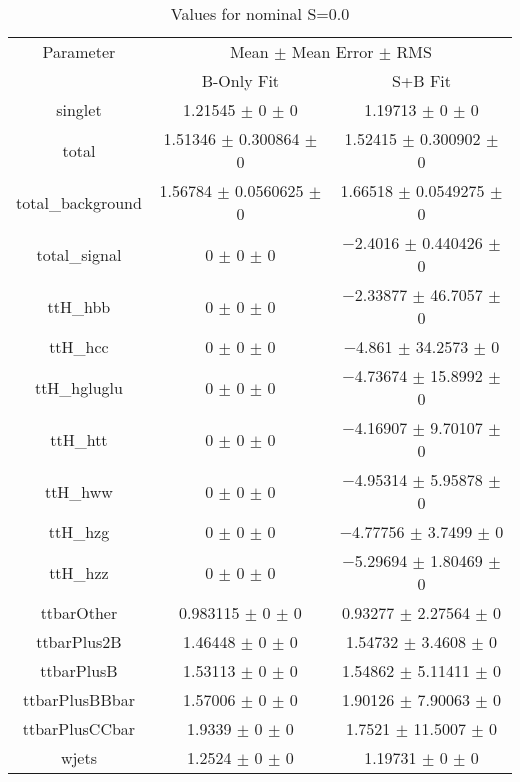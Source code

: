 \begin{table}
\centering
\caption{Values for nominal S=0.0}
\begin{tabular}{ccc}
\toprule
Parameter & \multicolumn{2}{c}{Mean $\pm$ Mean Error $\pm$ RMS}\\
 & B-Only Fit & S+B Fit\\
\midrule
singlet & \num{1.21545} $\pm$ \num{0} $\pm$ \num{0} & \num{1.19713} $\pm$ \num{0} $\pm$ \num{0}\\
total & \num{1.51346} $\pm$ \num{0.300864} $\pm$ \num{0} & \num{1.52415} $\pm$ \num{0.300902} $\pm$ \num{0}\\
total\_background & \num{1.56784} $\pm$ \num{0.0560625} $\pm$ \num{0} & \num{1.66518} $\pm$ \num{0.0549275} $\pm$ \num{0}\\
total\_signal & \num{0} $\pm$ \num{0} $\pm$ \num{0} & \num{-2.4016} $\pm$ \num{0.440426} $\pm$ \num{0}\\
ttH\_hbb & \num{0} $\pm$ \num{0} $\pm$ \num{0} & \num{-2.33877} $\pm$ \num{46.7057} $\pm$ \num{0}\\
ttH\_hcc & \num{0} $\pm$ \num{0} $\pm$ \num{0} & \num{-4.861} $\pm$ \num{34.2573} $\pm$ \num{0}\\
ttH\_hgluglu & \num{0} $\pm$ \num{0} $\pm$ \num{0} & \num{-4.73674} $\pm$ \num{15.8992} $\pm$ \num{0}\\
ttH\_htt & \num{0} $\pm$ \num{0} $\pm$ \num{0} & \num{-4.16907} $\pm$ \num{9.70107} $\pm$ \num{0}\\
ttH\_hww & \num{0} $\pm$ \num{0} $\pm$ \num{0} & \num{-4.95314} $\pm$ \num{5.95878} $\pm$ \num{0}\\
ttH\_hzg & \num{0} $\pm$ \num{0} $\pm$ \num{0} & \num{-4.77756} $\pm$ \num{3.7499} $\pm$ \num{0}\\
ttH\_hzz & \num{0} $\pm$ \num{0} $\pm$ \num{0} & \num{-5.29694} $\pm$ \num{1.80469} $\pm$ \num{0}\\
ttbarOther & \num{0.983115} $\pm$ \num{0} $\pm$ \num{0} & \num{0.93277} $\pm$ \num{2.27564} $\pm$ \num{0}\\
ttbarPlus2B & \num{1.46448} $\pm$ \num{0} $\pm$ \num{0} & \num{1.54732} $\pm$ \num{3.4608} $\pm$ \num{0}\\
ttbarPlusB & \num{1.53113} $\pm$ \num{0} $\pm$ \num{0} & \num{1.54862} $\pm$ \num{5.11411} $\pm$ \num{0}\\
ttbarPlusBBbar & \num{1.57006} $\pm$ \num{0} $\pm$ \num{0} & \num{1.90126} $\pm$ \num{7.90063} $\pm$ \num{0}\\
ttbarPlusCCbar & \num{1.9339} $\pm$ \num{0} $\pm$ \num{0} & \num{1.7521} $\pm$ \num{11.5007} $\pm$ \num{0}\\
wjets & \num{1.2524} $\pm$ \num{0} $\pm$ \num{0} & \num{1.19731} $\pm$ \num{0} $\pm$ \num{0}\\
\bottomrule
\end{tabular}
\end{table}